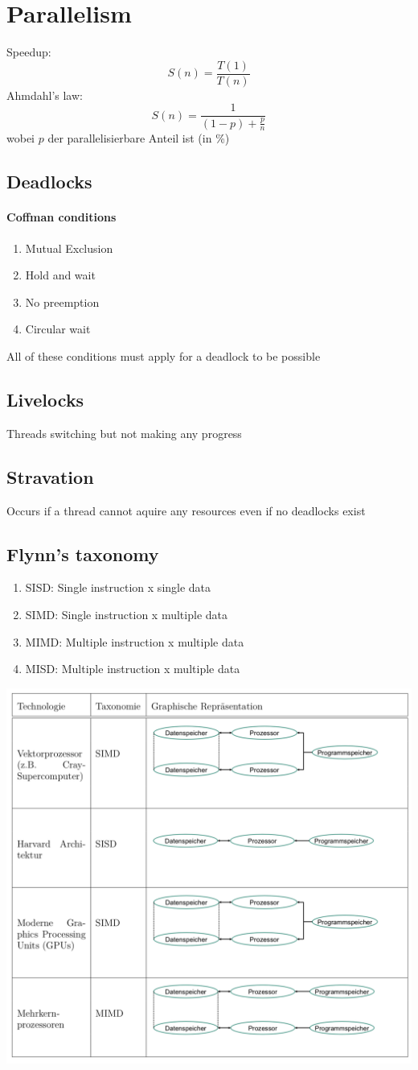 \section{Parallelism}
Speedup:
$$S(n) = \frac{T(1)}{T(n)}$$
Ahmdahl's law:
$$ S(n) = \frac{1}{(1 - p)+\frac{p}{n}}$$
wobei $p$ der parallelisierbare Anteil ist (in \%)
\subsection{Deadlocks}
\paragraph{Coffman conditions}
\begin{enumerate}
	\item Mutual Exclusion
	\item Hold and wait
	\item No preemption
	\item Circular wait
\end{enumerate}
All of these conditions must apply for a deadlock to be possible
\subsection{Livelocks}
Threads switching but not making any progress
\subsection{Stravation}
Occurs if a thread cannot aquire any resources even if no deadlocks exist

\subsection{Flynn's taxonomy}

\begin{enumerate}
	\item SISD: Single instruction x single data
	\item SIMD: Single instruction x multiple data
	\item MIMD: Multiple instruction x multiple data	
	\item MISD: Multiple instruction x multiple data
\end{enumerate}

\includegraphics[width=\columnwidth]{images/flynn.png}